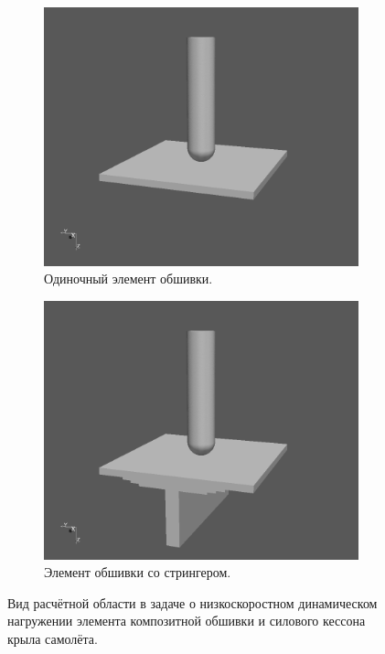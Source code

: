 \begin{figure}[htp]
\centering
\begin{subfigure}[b]{0.45\textwidth}
\centering
\includegraphics[width=\textwidth]{png/pkm-experiment/wing-only/scene-bw.png}
\caption{Одиночный элемент обшивки.}
\end{subfigure}
\begin{subfigure}[b]{0.45\textwidth}
\centering
\includegraphics[width=\textwidth]{png/pkm-experiment/wing-stringer/scene-bw.png}
\caption{Элемент обшивки со стрингером.}
\end{subfigure}
\caption{Вид расчётной области в задаче о низкоскоростном динамическом нагружении элемента композитной обшивки и силового кессона крыла самолёта.}
\label{pic:pkm_problem}
\end{figure}


